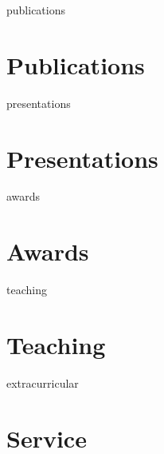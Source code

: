\documentclass[12pt]{report} %
\begin{document}
\ifcsname publications\endcsname%
\section{Publications}
\publications{}
\fi



\ifcsname presentations\endcsname%
\section{Presentations}
\presentations{}
\fi



\ifcsname awards\endcsname%
\section{Awards}
\awards{}
\fi



\ifcsname teaching\endcsname%
\section{Teaching}
\teaching{}
\fi



\ifcsname extracurricular\endcsname%
\section{Service}
\extracurricular{}
\fi



\iffalse
\ifcsname languages\endcsname%
\section{Languages}
\languages{}
\fi
\fi
\end{document}
